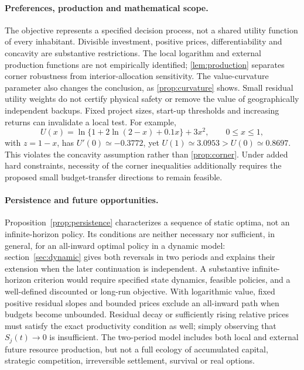 \documentclass[11pt,a4paper]{article}
\theoremstyle{definition}\newtheorem{definition}{Definition}
\begin{document}
\paragraph{Preferences, production and mathematical scope.}
The objective represents a specified decision process, not a shared
utility function of every inhabitant. Divisible investment, positive
prices, differentiability and concavity are substantive restrictions.
The local logarithm and external production functions are not empirically
identified; \cref{lem:production} separates corner robustness from
interior-allocation sensitivity. The value-curvature parameter also
changes the conclusion, as \cref{prop:curvature} shows. Small residual
utility weights do not certify physical safety or remove the value of
geographically independent backups. Fixed project sizes, start-up
thresholds and increasing returns can invalidate a local test. For example,
\begin{equation}
 U(x)=\ln\{1+2\ln(2-x)+0.1x\}+3x^2,\qquad 0\leq x\leq1,
 \label{eq:nonconcave}
\end{equation}
with $z=1-x$, has $U'(0)\simeq-0.3772$, yet
$U(1)\simeq3.0953>U(0)\simeq0.8697$. This violates the concavity
assumption rather than \cref{prop:corner}. Under added hard constraints,
necessity of the corner inequalities additionally requires the proposed
small budget-transfer directions to remain feasible.

\paragraph{Persistence and future opportunities.}
Proposition~\ref{prop:persistence} characterizes a sequence of static
optima, not an infinite-horizon policy. Its conditions are neither
necessary nor sufficient, in general, for an all-inward optimal policy
in a dynamic model: section~\ref{sec:dynamic} gives both reversals in two periods and
explains their extension when the later continuation is independent.
A substantive infinite-horizon criterion would require specified state
dynamics, feasible policies, and a well-defined discounted or long-run
objective. With logarithmic value, fixed positive residual slopes and bounded prices
exclude an all-inward path when budgets become unbounded. Residual decay
or sufficiently rising relative prices must satisfy the exact productivity
condition as well; simply observing that $S_j(t)\to0$ is insufficient.
The two-period model includes both local and external future resource
production, but not a full ecology of accumulated capital, strategic
competition, irreversible settlement, survival or real options.
\end{document}
